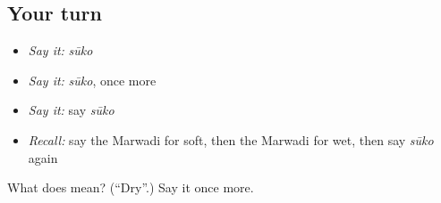 \subsection*{Your turn}
\begin{itemize}
\raggedright
  \item \emph{Say it:} \emph{sūko}
  \item \emph{Say it:} \emph{sūko}, once more
  \item \emph{Say it:} say \emph{sūko}
  \item \emph{Recall:} say the Marwadi for soft, then the Marwadi for wet, then say \emph{sūko} again
\end{itemize}

\begin{tcolorbox}[breakable,colback=teal!4,colframe=teal!35!black,title={Before you move on}]
What does  mean? (\textquotedblleft{}Dry\textquotedblright{}.) Say it once more.
\end{tcolorbox}

